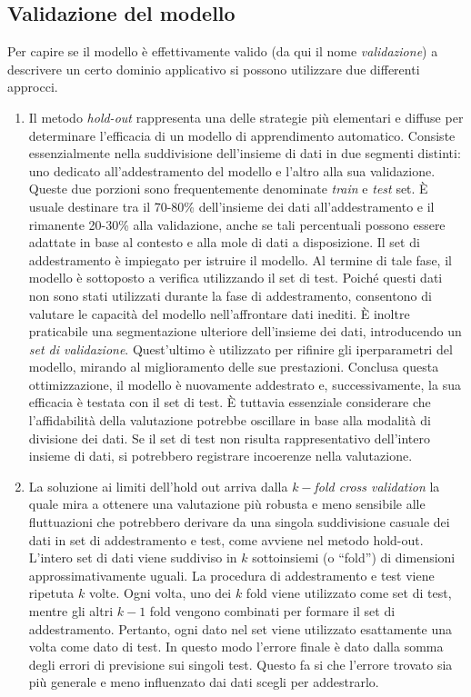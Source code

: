 \documentclass[12pt,a4paper,twoside,openright]{book}
\begin{document}
\subsection{Validazione del modello}
Per capire se il modello è effettivamente valido (da qui il nome \emph{validazione}) a descrivere un certo dominio applicativo si possono utilizzare due differenti approcci.
\begin{enumerate}
    \item Il metodo \emph{hold-out} rappresenta una delle strategie più elementari e diffuse per determinare l'efficacia di un modello di apprendimento automatico. Consiste essenzialmente nella suddivisione dell'insieme di dati in due segmenti distinti: uno dedicato all'addestramento del modello e l'altro alla sua validazione. Queste due porzioni sono frequentemente denominate \emph{train} e \emph{test} set.
    È usuale destinare tra il 70-80\% dell'insieme dei dati all'addestramento e il rimanente 20-30\% alla validazione, anche se tali percentuali possono essere adattate in base al contesto e alla mole di dati a disposizione.
    Il set di addestramento è impiegato per istruire il modello. Al termine di tale fase, il modello è sottoposto a verifica utilizzando il set di test. Poiché questi dati non sono stati utilizzati durante la fase di addestramento, consentono di valutare le capacità del modello nell'affrontare dati inediti.
    È inoltre praticabile una segmentazione ulteriore dell'insieme dei dati, introducendo un \emph{set di validazione}. Quest'ultimo è utilizzato per rifinire gli iperparametri del modello, mirando al miglioramento delle sue prestazioni. Conclusa questa ottimizzazione, il modello è nuovamente addestrato e, successivamente, la sua efficacia è testata con il set di test.
    È tuttavia essenziale considerare che l'affidabilità della valutazione potrebbe oscillare in base alla modalità di divisione dei dati. Se il set di test non risulta rappresentativo dell'intero insieme di dati, si potrebbero registrare incoerenze nella valutazione.
    \item La soluzione ai limiti dell'hold out arriva dalla \emph{$k-$fold cross validation} la quale mira a ottenere una valutazione più robusta e meno sensibile alle fluttuazioni che potrebbero derivare da una singola suddivisione casuale dei dati in set di addestramento e test, come avviene nel metodo hold-out. L'intero set di dati viene suddiviso in $k$ sottoinsiemi (o ``fold'') di dimensioni approssimativamente uguali. La procedura di addestramento e test viene ripetuta $k$ volte. Ogni volta, uno dei $k$ fold viene utilizzato come set di test, mentre gli altri $k-1$ fold vengono combinati per formare il set di addestramento. Pertanto, ogni dato nel set viene utilizzato esattamente una volta come dato di test. In questo modo l'errore finale è dato dalla somma degli errori di previsione sui singoli test. Questo fa si che l'errore trovato sia più generale e meno influenzato dai dati scegli per addestrarlo.
\end{enumerate}
\end{document}
